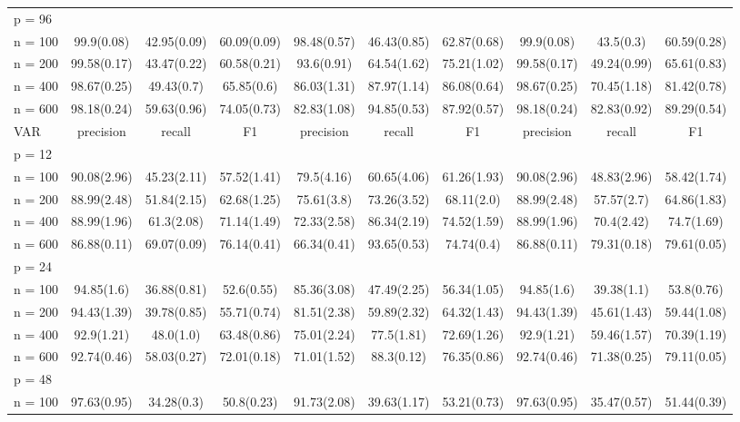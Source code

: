 \begin{sidewaystable}
\begin{tabular}{l@{\hskip 0.4in} ccc ccc ccc}
 p = 96 & & & & & & & & & \\
\multicolumn{1}{r}{n = 100}&99.9(0.08)&42.95(0.09)&60.09(0.09)&98.48(0.57)&46.43(0.85)&62.87(0.68)&99.9(0.08)&43.5(0.3)&60.59(0.28)\\
\multicolumn{1}{r}{n = 200}&99.58(0.17)&43.47(0.22)&60.58(0.21)&93.6(0.91)&64.54(1.62)&75.21(1.02)&99.58(0.17)&49.24(0.99)&65.61(0.83)\\
\multicolumn{1}{r}{n = 400}&98.67(0.25)&49.43(0.7)&65.85(0.6)&86.03(1.31)&87.97(1.14)&86.08(0.64)&98.67(0.25)&70.45(1.18)&81.42(0.78)\\
\multicolumn{1}{r}{n = 600}&98.18(0.24)&59.63(0.96)&74.05(0.73)&82.83(1.08)&94.85(0.53)&87.92(0.57)&98.18(0.24)&82.83(0.92)&89.29(0.54)\\
VAR & precision & recall & F1 & precision & recall & F1 & precision & recall & F1\\
 p = 12 & & & & & & & & & \\
\multicolumn{1}{r}{n = 100}&90.08(2.96)&45.23(2.11)&57.52(1.41)&79.5(4.16)&60.65(4.06)&61.26(1.93)&90.08(2.96)&48.83(2.96)&58.42(1.74)\\
\multicolumn{1}{r}{n = 200}&88.99(2.48)&51.84(2.15)&62.68(1.25)&75.61(3.8)&73.26(3.52)&68.11(2.0)&88.99(2.48)&57.57(2.7)&64.86(1.83)\\
\multicolumn{1}{r}{n = 400}&88.99(1.96)&61.3(2.08)&71.14(1.49)&72.33(2.58)&86.34(2.19)&74.52(1.59)&88.99(1.96)&70.4(2.42)&74.7(1.69)\\
\multicolumn{1}{r}{n = 600}&86.88(0.11)&69.07(0.09)&76.14(0.41)&66.34(0.41)&93.65(0.53)&74.74(0.4)&86.88(0.11)&79.31(0.18)&79.61(0.05)\\
 p = 24 & & & & & & & & & \\
\multicolumn{1}{r}{n = 100}&94.85(1.6)&36.88(0.81)&52.6(0.55)&85.36(3.08)&47.49(2.25)&56.34(1.05)&94.85(1.6)&39.38(1.1)&53.8(0.76)\\
\multicolumn{1}{r}{n = 200}&94.43(1.39)&39.78(0.85)&55.71(0.74)&81.51(2.38)&59.89(2.32)&64.32(1.43)&94.43(1.39)&45.61(1.43)&59.44(1.08)\\
\multicolumn{1}{r}{n = 400}&92.9(1.21)&48.0(1.0)&63.48(0.86)&75.01(2.24)&77.5(1.81)&72.69(1.26)&92.9(1.21)&59.46(1.57)&70.39(1.19)\\
\multicolumn{1}{r}{n = 600}&92.74(0.46)&58.03(0.27)&72.01(0.18)&71.01(1.52)&88.3(0.12)&76.35(0.86)&92.74(0.46)&71.38(0.25)&79.11(0.05)\\
 p = 48 & & & & & & & & & \\
\multicolumn{1}{r}{n = 100}&97.63(0.95)&34.28(0.3)&50.8(0.23)&91.73(2.08)&39.63(1.17)&53.21(0.73)&97.63(0.95)&35.47(0.57)&51.44(0.39)\\

\end{tabular}
\end{sidewaystable}
